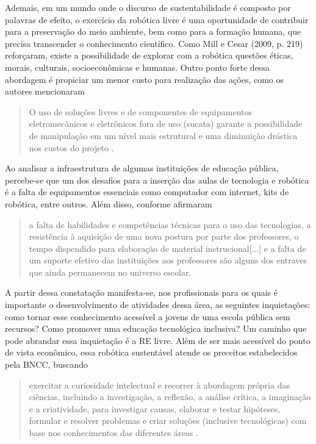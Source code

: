 \documentclass{textolivre}
\begin{document}
Ademais, em um mundo onde o discurso de sustentabilidade é composto por
palavras de efeito, o exercício da robótica livre é uma oportunidade de
contribuir para a preservação do meio ambiente, bem como para a formação
humana, que precisa transcender o conhecimento científico. Como Mill e Cesar
(2009, p. 219) reforçaram, existe a possibilidade de explorar com a robótica
questões éticas, morais, culturais, socioeconômicas e humanas. Outro ponto
forte dessa abordagem é propiciar um menor custo para realização das ações,
como os autores mencionaram
\begin{quote}
O uso de soluções livres e de componentes de equipamentos eletromecânicos e
eletrônicos fora de uso (sucata) garante a possibilidade de manipulação em um
nível mais estrutural e uma diminuição drástica nos custos do projeto \cite[p. 227]{mill2009}.
\end{quote}

Ao analisar a infraestrutura de algumas instituições de educação pública,
percebe-se que um dos desafios para a inserção das aulas de tecnologia e
robótica é a falta de equipamentos essenciais como computador com internet,
kits de robótica, entre outros. Além disso, conforme \textcite[p. 175]{ben2019} afirmaram
\begin{quote}
a falta de habilidades e competências técnicas para o uso das tecnologias, a
resistência à aquisição de uma nova postura por parte dos professores, o tempo
dispendido para elaboração de material instrucional[...] e a falta de um
suporte efetivo das instituições aos professores são alguns dos entraves que
ainda permanecem no universo escolar.
\end{quote}

A partir dessa constatação manifesta-se, nos profissionais para os quais é
importante o desenvolvimento de atividades dessa área, as seguintes
inquietações: como tornar esse conhecimento acessível a jovens de uma escola
pública sem recursos? Como promover uma educação tecnológica inclusiva? Um
caminho que pode abrandar essa inquietação é a RE livre. Além de ser mais
acessível do ponto de vista econômico, essa robótica sustentável atende os
preceitos estabelecidos pela BNCC, buscando
\begin{quote}
exercitar a curiosidade intelectual e recorrer à abordagem própria das
ciências, incluindo a investigação, a reflexão, a análise crítica, a imaginação
e a criatividade, para investigar causas, elaborar e testar hipóteses, formular
e resolver problemas e criar soluções (inclusive tecnológicas) com base nos
conhecimentos das diferentes áreas \cite[p. 9]{brasil2018}.
\end{quote}
\end{document}

